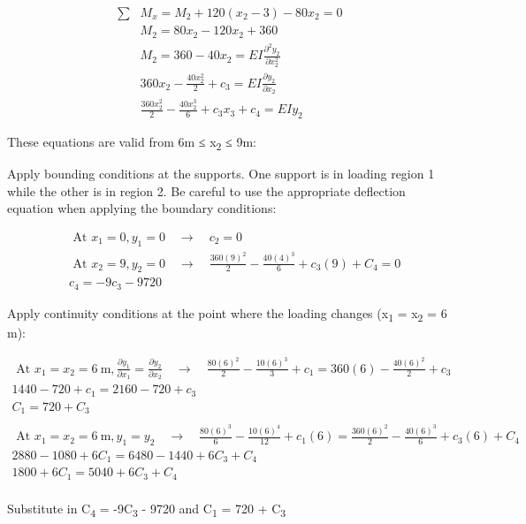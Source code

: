 \documentclass[
  letterpaper,
  DIV=11,
  numbers=noendperiod]{scrreprt}
\theoremstyle{definition}
\theoremstyle{remark}
\begin{document}
\begin{tcolorbox}
\begin{tcolorbox}
\[
\begin{aligned}
\sum & M_x= M_2+120\left(x_2-3\right)-80 x_2=0 \\ 
&M_2  =80 x_2-120 x_2+360 \\ 
&M_2 =360-40 x_2=E I \frac{\partial^2 y_2}{\partial x_2^2} \\ 
&360 x_2-\frac{40 x_2^2}{2}+c_3=E I \frac{\partial y_2}{\partial x_2} \\ 
&\frac{360 x_2^2}{2}-\frac{40 x_2^3}{6}+c_3 x_3+c_4  =E I y_2
\end{aligned}
\]

These equations are valid from 6m ≤ x\textsubscript{2} ≤ 9m:

Apply bounding conditions at the supports. One support is in loading
region 1 while the other is in region 2. Be careful to use the
appropriate deflection equation when applying the boundary conditions:

\[
\begin{aligned} & \text { At } x_1=0, y_1=0 \quad \rightarrow \quad c_2=0 \\ & \text { At } x_2=9, y_2=0 \quad \rightarrow \quad \frac{360(9)^2}{2}-\frac{40(4)^3}{6}+c_3(9) +C_4=0 \\ & c_4=-9 c_3-9720\end{aligned}
\]

Apply continuity conditions at the point where the loading changes
(x\textsubscript{1} = x\textsubscript{2} = 6 m):

\[
\begin{gathered} \text { At } x_1=x_2=6 \mathrm{~m}, \frac{\partial y_1}{\partial x_1}=\frac{\partial y_2}{\partial x_2} \quad \rightarrow \quad \frac{80(6)^2}{2}-\frac{10(6)^3}{3}+c_1=360(6)-\frac{40(6)^2}{2}+c_3 \\ 1440-720+c_1=2160-720+c_3 \\ C_1=720+C_3 \\ \\  \text { At } x_1=x_2=6 \mathrm{~m}, y_1=y_2 \quad \rightarrow \quad\frac{80(6)^3}{6}-\frac{10(6)^4}{12}+c_1(6)=\frac{360(6)^2}{2} - \frac{40(6)^3}{6}+c_3(6) +C_4 \\ 2880-1080+6 C_1=6480-1440+6 C_3+C_4 \\ 1800+6 C_1=5040+6 C_3+C_4 \\\end{gathered}
\]

Substitute in C\textsubscript{4} = -9C\textsubscript{3} - 9720 and
C\textsubscript{1} = 720 + C\textsubscript{3}


\end{tcolorbox}
\end{tcolorbox}
\end{document}

